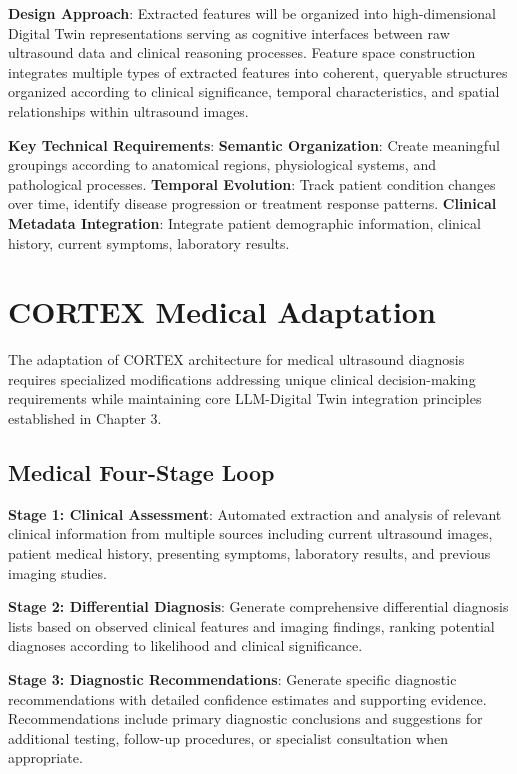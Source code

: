 \textbf{Design Approach}: Extracted features will be organized into high-dimensional Digital Twin representations serving as cognitive interfaces between raw ultrasound data and clinical reasoning processes. Feature space construction integrates multiple types of extracted features into coherent, queryable structures organized according to clinical significance, temporal characteristics, and spatial relationships within ultrasound images.

\textbf{Key Technical Requirements}:
\textbf{Semantic Organization}: Create meaningful groupings according to anatomical regions, physiological systems, and pathological processes.
\textbf{Temporal Evolution}: Track patient condition changes over time, identify disease progression or treatment response patterns.
\textbf{Clinical Metadata Integration}: Integrate patient demographic information, clinical history, current symptoms, laboratory results.

\section{CORTEX Medical Adaptation}

The adaptation of CORTEX architecture for medical ultrasound diagnosis requires specialized modifications addressing unique clinical decision-making requirements while maintaining core LLM-Digital Twin integration principles established in Chapter 3.

\subsection{Medical Four-Stage Loop}

\textbf{Stage 1: Clinical Assessment}: Automated extraction and analysis of relevant clinical information from multiple sources including current ultrasound images, patient medical history, presenting symptoms, laboratory results, and previous imaging studies.

\textbf{Stage 2: Differential Diagnosis}: Generate comprehensive differential diagnosis lists based on observed clinical features and imaging findings, ranking potential diagnoses according to likelihood and clinical significance.

\textbf{Stage 3: Diagnostic Recommendations}: Generate specific diagnostic recommendations with detailed confidence estimates and supporting evidence. Recommendations include primary diagnostic conclusions and suggestions for additional testing, follow-up procedures, or specialist consultation when appropriate.

